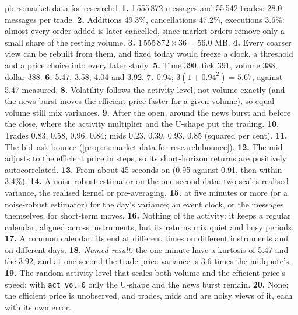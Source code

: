 \begin{solution}{pb:rs:market-data-for-research:1}
\textbf{1.} 1\,555\,872 messages and 55\,542 trades: 28.0 messages per trade. \textbf{2.} Additions 49.3\%, cancellations 47.2\%,
executions 3.6\%: almost every order added is later cancelled, since market orders remove only a small share of the resting
volume. \textbf{3.} $1\,555\,872 \times 36 = 56.0$ MB. \textbf{4.} Every coarser view can be rebuilt from them, and  fixed
today would freeze a clock, a threshold and a price choice into every later study. \textbf{5.} Time 390, tick 391, volume 388,
dollar 388. \textbf{6.} 5.47, 3.58, 4.04 and 3.92. \textbf{7.} 0.94; $3(1 + 0.94^2) = 5.67$, against 5.47 measured.
\textbf{8.} Volatility follows the activity level, not volume exactly (and the news burst moves the efficient price faster for a
given volume), so equal-volume  still mix variances. \textbf{9.} After the open, around the news burst and before the close,
where the activity multiplier and the U-shape put the trading. \textbf{10.} Trades 0.83, 0.58, 0.96, 0.84; mids 0.23, 0.39, 0.93,
0.85 (squared per cent). \textbf{11.} The bid--ask bounce (\cref{prop:rs:market-data-for-research:bounce}). \textbf{12.} The mid
adjusts to the efficient price in steps, so its short-horizon returns are positively autocorrelated. \textbf{13.} From about 45
seconds on (0.95 against 0.91, then within 3.4\%). \textbf{14.} A noise-robust estimator on the one-second data: two-scales
realised variance, the realised kernel or pre-averaging. \textbf{15.}  at five minutes or more (or a noise-robust
estimator) for the day's variance; an event clock, or the messages themselves, for short-term moves. \textbf{16.} Nothing of the
activity: it keeps a regular calendar, aligned across instruments, but its returns mix quiet and busy periods. \textbf{17.} A
common calendar: its  end at different times on different instruments and on different days. \textbf{18.} \emph{Named
result:} the one-minute  have a kurtosis of 5.47 and the  3.92, and at one second the trade-price variance is
3.6 times the midquote's. \textbf{19.} The random activity level that scales both volume and the efficient price's speed; with
\texttt{act\_vol=0} only the U-shape and the news burst remain. \textbf{20.} None: the efficient price is unobserved, and trades,
mids and  are noisy views of it, each with its own error.
\end{solution}


